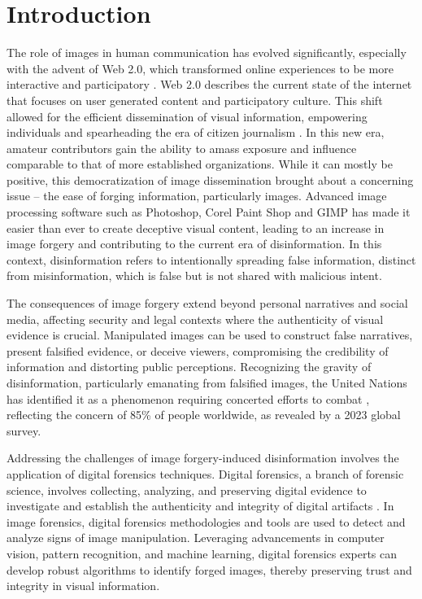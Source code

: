 \chapter{Introduction}
\label{chap:intro}

The role of images in human communication has evolved significantly, especially with the advent of Web 2.0, which transformed online experiences to be more interactive and participatory \cite{Murugesan_2007}. Web 2.0 describes the current state of the internet that focuses on user generated content and participatory culture. This shift allowed for the efficient dissemination of visual information, empowering individuals and spearheading the era of citizen journalism \cite{citizenJournalism}. In this new era, amateur contributors gain the ability to amass exposure and influence comparable to that of more established organizations. While it can mostly be positive, this democratization of image dissemination brought about a concerning issue – the ease of forging information, particularly images. Advanced image processing software such as Photoshop, Corel Paint Shop and GIMP has made it easier than ever to create deceptive visual content, leading to an increase in image forgery and contributing to the current era of disinformation. In this context, disinformation refers to intentionally spreading false information, distinct from misinformation, which is false but is not shared with malicious intent. \cite{MuhammedT_Mathew_2022}

The consequences of image forgery extend beyond personal narratives and social media, affecting security and legal contexts where the authenticity of visual evidence is crucial. Manipulated images can be used to construct false narratives, present falsified evidence, or deceive viewers, compromising the credibility of information and distorting public perceptions. Recognizing the gravity of disinformation, particularly emanating from falsified images, the United Nations has identified it as a phenomenon requiring concerted efforts to combat \cite{UNReport}, reflecting the concern of 85\% of people worldwide, as revealed by a 2023 global survey. \cite{Henley_2023}


Addressing the challenges of image forgery-induced disinformation involves the application of digital forensics techniques. Digital forensics, a branch of forensic science, involves collecting, analyzing, and preserving digital evidence to investigate and establish the authenticity and integrity of digital artifacts \cite{zakariah2018}. In image forensics, digital forensics methodologies and tools are used to detect and analyze signs of image manipulation. Leveraging advancements in computer vision, pattern recognition, and machine learning, digital forensics experts can develop robust algorithms to identify forged images, thereby preserving trust and integrity in visual information. \cite{FERREIRA2020106685} 

